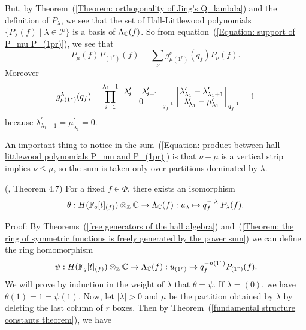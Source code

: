 But, by Theorem~(\ref{Theorem: orthogonality of Jing's Q_lambda}) and the definition of $P_\lambda$, we see that the set of Hall-Littlewood polynomials $\{P_\lambda(f)\;|\;\lambda\in\mathcal{P}\}$ is a basis of $\Lambda_{\mathbb{C}}(f)$. So from equation~(\ref{Equation: support of P_mu P_(1pr)}), we see that
\begin{equation}
    P_\mu(f)P_{(1^r)}(f) = \sum_{\nu}g_{\mu(1^r)}^\nu(q_f)P_\nu(f).
\end{equation}
Moreover
\begin{equation}
    g_{\mu(1^r)}^\lambda(q_f)=\prod_{i=1}^{\lambda_1-1}\begin{bmatrix} \lambda_i^\prime-\lambda_{i+1}^\prime\\0\end{bmatrix}_{q_f^{-1}}\begin{bmatrix} \lambda_{\lambda_1}^\prime-\lambda_{\lambda_1+1}^\prime\\\lambda_{\lambda_1}^\prime-\mu_{\lambda_1}^\prime\end{bmatrix}_{q_f^{-1}}=1
\end{equation}
because $\lambda_{\lambda_1+1}^\prime=\mu_{\lambda_1}^\prime=0$.\par
An important thing to notice in the sum~(\ref{Equation: product between hall littlewood polynomials P_mu and P_(1pr)}) is that $\nu-\mu$ is a vertical strip implies $\nu\leq \mu$, so the sum is taken only over partitions dominated by $\lambda$.
\begin{dang}
    \begin{theorem}(\cite{jing2024characters}, Theorem 4.7)\label{Theorem: Hall algebra is isomorphic to the ring of symmetric functions}
        For a fixed $f\in\Phi$, there exists an isomorphism
        \begin{equation}
            \theta: H(\mathbb{F}_q[t]_{(f)})\otimes_{\mathbb{Z}}\mathbb{C}\rightarrow \Lambda_{\mathbb{C}}(f): u_\lambda\mapsto q_f^{-|\lambda|}P_\lambda(f).
        \end{equation}
    \end{theorem}
\end{dang}
Proof: By Theorems~(\ref{free generators of the hall algebra}) and~(\ref{Theorem: the ring of symmetric functions is freely generated by the power sum}) we can define the ring homomorphism
\begin{equation}
    \psi:H(\mathbb{F}_q[t]_{(f)})\otimes_{\mathbb{Z}}\mathbb{C}\rightarrow \Lambda_{\mathbb{C}}(f): u_{(1^r)}\mapsto q_f^{-n(1^r)}P_{(1^r)}(f).
\end{equation}
We will prove by induction in the weight of $\lambda$ that $\theta=\psi$. If $\lambda=(0)$, we have $\theta(1)=1=\psi(1)$. Now, let $|\lambda|>0$ and $\mu$ be the partition obtained by $\lambda$ by deleting the last column of $r$ boxes. Then by Theorem~(\ref{fundamental structure constants theorem}), we have
